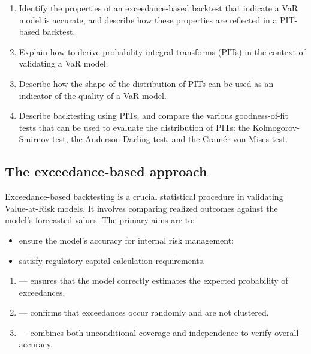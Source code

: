 
\begin{mrkeybox}[title={Learning objectives in this reading}]
\small
\begin{enumerate}[label=\textbf{\alph*.},leftmargin=1.7em]
\item Identify the properties of an exceedance-based backtest that indicate a VaR model is
      accurate, and describe how these properties are reflected in a PIT-based backtest.
\item Explain how to derive probability integral transforms (PITs) in the context of validating
      a VaR model.
\item Describe how the shape of the distribution of PITs can be used as an indicator of the
      quality of a VaR model.
\item Describe backtesting using PITs, and compare the various goodness-of-fit tests that can be
      used to evaluate the distribution of PITs: the Kolmogorov-Smirnov test, the
      Anderson-Darling test, and the Cram\'er-von Mises test.
\end{enumerate}
\end{mrkeybox}


\subsection{The exceedance-based approach}
Exceedance-based backtesting is a crucial statistical procedure in validating Value-at-Risk
models. It involves comparing realized outcomes against the model's forecasted values. The
primary aims are to:
\begin{itemize}
\item ensure the model's accuracy for internal risk management;
\item satisfy regulatory capital calculation requirements.
\end{itemize}

\begin{mrkeybox}[title={The three properties of a well-calibrated VaR model}]
\begin{enumerate}
\item {} --- ensures that the model correctly estimates the expected
      probability of exceedances.
\item {} --- confirms that exceedances occur randomly and are not clustered.
\item {} --- combines both unconditional coverage and independence to
      verify overall accuracy.
\end{enumerate}
\end{mrkeybox}

